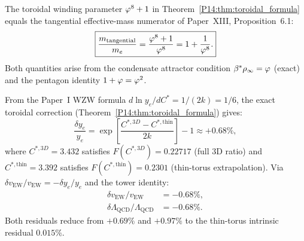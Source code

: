 \begin{corollary}
\label{P14:cor:phi8_structural}
The toroidal winding parameter $\varphi^8+1$ in
Theorem~\ref{P14:thm:toroidal_formula} equals the tangential
effective-mass numerator of Paper~XIII, Proposition~6.1:
\begin{equation}
  \boxed{\frac{m_{\mathrm{tangential}}}{m_e} = \frac{\varphi^8+1}{\varphi^8} = 1+\frac{1}{\varphi^8}.}
  \label{P14:eq:phi8_identity}
\end{equation}
Both quantities arise from the condensate attractor condition
$\beta^{*}\rho_\infty=\varphi$ (exact) and the pentagon identity $1+\varphi=\varphi^2$.
\end{corollary}

\begin{corollary}
\label{P14:cor:yukawa_3D}
From the Paper~I WZW formula $d\ln y_e/dC^*=1/(2k)=1/6$, the exact
toroidal correction (Theorem~\ref{P14:thm:toroidal_formula}) gives:
\begin{equation}
  \boxed{\frac{\delta y_e}{y_e}
  = \exp\!\left[\frac{C^{*,3D} - C^{*,\mathrm{thin}}}{2k}\right] - 1
  \approx +0.68\%,}
  \label{P14:eq:delta_ye}
\end{equation}
where $C^{*,3D}=3.432$ satisfies $F(C^{*,3D})=0.22717$ (full 3D ratio)
and $C^{*,\mathrm{thin}}=3.392$ satisfies
$F(C^{*,\mathrm{thin}})=0.2301$ (thin-torus extrapolation).
Via $\delta v_\mathrm{EW}/v_\mathrm{EW} = -\delta y_e/y_e$ and the tower identity:
\begin{align*}
  \delta v_\mathrm{EW}/v_\mathrm{EW} &= -0.68\%, \\
  \delta\Lambda_\mathrm{QCD}/\Lambda_\mathrm{QCD} &= -0.68\%.
\end{align*}
Both residuals reduce from $+0.69\%$ and $+0.97\%$ to the thin-torus
intrinsic residual $0.015\%$.
\end{corollary}

